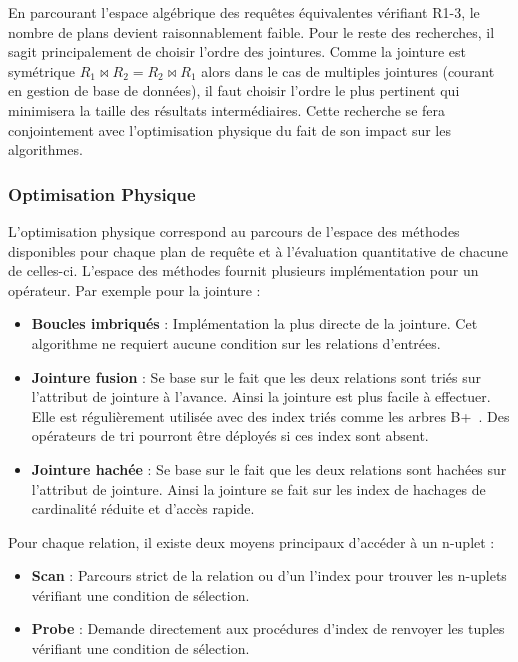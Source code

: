 En parcourant l'espace algébrique des requêtes équivalentes vérifiant R1-3, le nombre de plans devient raisonnablement faible. Pour le reste des recherches, il sagit principalement de choisir l'ordre des jointures. Comme la jointure est symétrique $R_1 \Join R_2 = R_2 \Join R_1$ alors dans le cas de multiples jointures (courant en gestion de base de données), il faut choisir l'ordre le plus pertinent qui minimisera la taille des résultats intermédiaires. Cette recherche se fera conjointement avec l'optimisation physique du fait de son impact sur les algorithmes.

\subsubsection{Optimisation Physique}
L'optimisation physique correspond au parcours de l'espace des méthodes disponibles pour chaque plan de requête et à l'évaluation quantitative de chacune de celles-ci. L'espace des méthodes fournit plusieurs implémentation pour un opérateur. Par exemple pour la jointure :
\begin{itemize}
    \item \textbf{Boucles imbriqués} : Implémentation la plus directe de la jointure. Cet algorithme ne requiert aucune condition sur les relations d'entrées.
    \item \textbf{Jointure fusion} : Se base sur le fait que les deux relations sont triés sur l'attribut de jointure à l'avance. Ainsi la jointure est plus facile à effectuer. Elle est régulièrement utilisée avec des index triés comme les arbres B+~\cite{refneeded-b+tree}. Des opérateurs de tri pourront être déployés si ces index sont absent.
    \item \textbf{Jointure hachée} : Se base sur le fait que les deux relations sont hachées sur l'attribut de jointure. Ainsi la jointure se fait sur les index de hachages de cardinalité réduite et d'accès rapide.
\end{itemize}

Pour chaque relation, il existe deux moyens principaux d'accéder à un n-uplet :
\begin{itemize}
 \item \textbf{Scan} : Parcours strict de la relation ou d'un l'index pour trouver les n-uplets vérifiant une condition de sélection.
 \item \textbf{Probe} : Demande directement aux procédures d'index de renvoyer les tuples vérifiant une condition de sélection.
\end{itemize}

